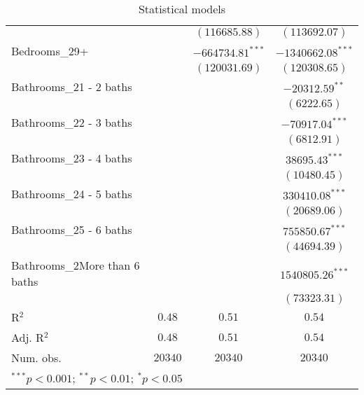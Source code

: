 \documentclass[12pt,letterpaper]{article}
\begin{document}
\begin{table}
\begin{center}
\begin{tabular}{l c c c}
			&                   & $(116685.88)$      & $(113692.07)$       \\
			Bedrooms\_29+                 &                   & $-664734.81^{***}$ & $-1340662.08^{***}$ \\
			&                   & $(120031.69)$      & $(120308.65)$       \\
			Bathrooms\_21 - 2 baths       &                   &                    & $-20312.59^{**}$    \\
			&                   &                    & $(6222.65)$         \\
			Bathrooms\_22 - 3 baths       &                   &                    & $-70917.04^{***}$   \\
			&                   &                    & $(6812.91)$         \\
			Bathrooms\_23 - 4 baths       &                   &                    & $38695.43^{***}$    \\
			&                   &                    & $(10480.45)$        \\
			Bathrooms\_24 - 5 baths       &                   &                    & $330410.08^{***}$   \\
			&                   &                    & $(20689.06)$        \\
			Bathrooms\_25 - 6 baths       &                   &                    & $755850.67^{***}$   \\
			&                   &                    & $(44694.39)$        \\
			Bathrooms\_2More than 6 baths &                   &                    & $1540805.26^{***}$  \\
			&                   &                    & $(73323.31)$        \\
			\hline
			R$^2$                         & $0.48$            & $0.51$             & $0.54$              \\
			Adj. R$^2$                    & $0.48$            & $0.51$             & $0.54$              \\
			Num. obs.                     & $20340$           & $20340$            & $20340$             \\
			\hline
			\multicolumn{4}{l}{\scriptsize{$^{***}p<0.001$; $^{**}p<0.01$; $^{*}p<0.05$}}
		\end{tabular}
		\caption{Statistical models}
		\label{table:coefficients}
	\end{center}
\end{table}
\end{document}
